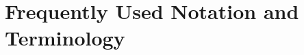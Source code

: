 \documentclass[usenames,dvipsnames]{article}
\theoremstyle{plain}
\theoremstyle{plain}
\newtheorem*{remark}{Remark}
\begin{document}


\section{Frequently Used Notation and Terminology}
\end{document}
